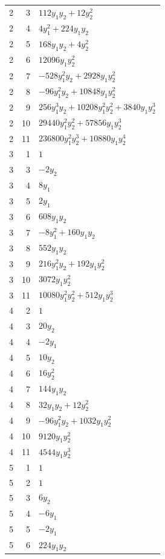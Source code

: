 \documentclass[10pt,a4paper]{article}
\begin{document}
{\begin{longtable}{rrp{125mm}}
2 & 3 & $112 y_{1} y_{2} + 12 y_{2}^{2}$\\
2 & 4 & $4 y_{1}^{2} + 224 y_{1} y_{2}$\\
2 & 5 & $168 y_{1} y_{2} + 4 y_{2}^{2}$\\
2 & 6 & $12096 y_{1} y_{2}^{2}$\\
2 & 7 & $- 528 y_{1}^{2} y_{2} + 2928 y_{1} y_{2}^{2}$\\
2 & 8 & $- 96 y_{1}^{2} y_{2} + 10848 y_{1} y_{2}^{2}$\\
2 & 9 & $256 y_{1}^{3} y_{2} + 10208 y_{1}^{2} y_{2}^{2} + 3840 y_{1} y_{2}^{3}$\\
2 & 10 & $29440 y_{1}^{2} y_{2}^{2} + 57856 y_{1} y_{2}^{3}$\\
2 & 11 & $236800 y_{1}^{2} y_{2}^{3} + 10880 y_{1} y_{2}^{4}$\\
3 & 1 & $1$\\
3 & 3 & $- 2 y_{2}$\\
3 & 4 & $8 y_{1}$\\
3 & 5 & $2 y_{1}$\\
3 & 6 & $608 y_{1} y_{2}$\\
3 & 7 & $- 8 y_{1}^{2} + 160 y_{1} y_{2}$\\
3 & 8 & $552 y_{1} y_{2}$\\
3 & 9 & $216 y_{1}^{2} y_{2} + 192 y_{1} y_{2}^{2}$\\
3 & 10 & $3072 y_{1} y_{2}^{2}$\\
3 & 11 & $10080 y_{1}^{2} y_{2}^{2} + 512 y_{1} y_{2}^{3}$\\
4 & 2 & $1$\\
4 & 3 & $20 y_{2}$\\
4 & 4 & $- 2 y_{1}$\\
4 & 5 & $10 y_{2}$\\
4 & 6 & $16 y_{2}^{2}$\\
4 & 7 & $144 y_{1} y_{2}$\\
4 & 8 & $32 y_{1} y_{2} + 12 y_{2}^{2}$\\
4 & 9 & $- 96 y_{1}^{2} y_{2} + 1032 y_{1} y_{2}^{2}$\\
4 & 10 & $9120 y_{1} y_{2}^{2}$\\
4 & 11 & $4544 y_{1} y_{2}^{3}$\\
5 & 1 & $1$\\
5 & 2 & $1$\\
5 & 3 & $6 y_{2}$\\
5 & 4 & $- 6 y_{1}$\\
5 & 5 & $- 2 y_{1}$\\
5 & 6 & $224 y_{1} y_{2}$\\

\end{longtable}}
\end{document}
